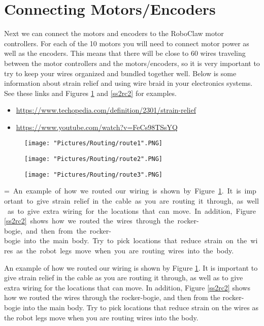 \documentclass[12pt]{article}
\makeatletter
\newcommand{\mybox}[1]{%
  \setbox0=\hbox{#1}%
  \setlength{\@tempdima}{\dimexpr\wd0+13pt}%
  \begin{tcolorbox}[colframe=mycolor,boxrule=0.5pt,arc=4pt,
      left=6pt,right=6pt,top=6pt,bottom=6pt,boxsep=0pt,width=0.95\textwidth]
    #1
  \end{tcolorbox}
}
\makeatother
\begin{document}
\section{Connecting Motors/Encoders}

Next we can connect the motors and encoders to the RoboClaw motor controllers. For each of the 10 motors you will need to connect motor power as well as the encoders. This means that there will be close to 60 wires traveling between the motor controllers and the motors/encoders, so it is very important to try to keep your wires organized and bundled together well. Below is some information about strain relief and using wire braid in your electronics systems.  See these links and Figures \ref{wiring1} and \ref{ss2rc2} for examples.

\begin{itemize}
	\item \href{https://www.techopedia.com/definition/2301/strain-relief}{https://www.techopedia.com/definition/2301/strain-relief}
	\item \href{https://www.youtube.com/watch?v=FeCs98TSsYQ}{https://www.youtube.com/watch?v=FeCs98TSsYQ}
\end{itemize}



\begin{figure}[H]
  	\centering
  	\begin{minipage}[b]{0.34\textwidth}
    		\texttt{[image: "Pictures/Routing/route1".PNG]}
  	\end{minipage}
  	\hfill
  	\begin{minipage}[b]{0.29\textwidth}
    		\texttt{[image: "Pictures/Routing/route2".PNG]}
  	\end{minipage}
    	\hfill
  	\begin{minipage}[b]{0.30\textwidth}
    		\texttt{[image: "Pictures/Routing/route3".PNG]}
  	\end{minipage}
  	\caption{}
	\label{wiring1}
\end{figure}


\mybox{
An example of how we routed our wiring is shown by Figure \ref{wiring1}. It is important to give strain relief in the cable as you are routing it through, as well as to give extra wiring for the locations that can move. In addition, Figure \ref{ss2rc2} shows how we routed the wires through the rocker-bogie, and then from the rocker-bogie into the main body. Try to pick locations that reduce strain on the wires as the robot legs move when you are routing wires into the body.
}
\end{document}
